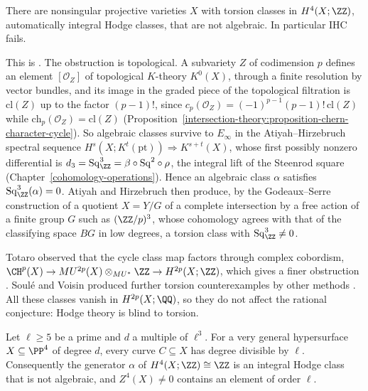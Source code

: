 \begin{theorem}\label{known-cases:theorem-atiyah-hirzebruch}
There are nonsingular projective varieties $X$ with torsion classes in $H^4(X; \ZZ)$, automatically integral Hodge classes, that are not algebraic. In particular $\mathrm{IHC}$ fails.
\end{theorem}

This is \cite{atiyah-hirzebruch-1962}. The obstruction is topological. A subvariety $Z$ of codimension $p$ defines an element $[\mathcal{O}_Z]$ of topological $K$-theory $K^0(X)$, through a finite
resolution by vector bundles, and its image in the graded piece of the topological filtration is $\mathrm{cl}(Z)$ up to the factor $(p-1)!$, since $c_p(\mathcal{O}_Z) = (-1)^{p-1}(p-1)!\,\mathrm{cl}(Z)$
while $\mathrm{ch}_p(\mathcal{O}_Z) = \mathrm{cl}(Z)$ (Proposition~\ref{intersection-theory:proposition-chern-character-cycle}). So algebraic classes survive to $E_\infty$ in the Atiyah--Hirzebruch spectral sequence
$H^s(X; K^t(\mathrm{pt})) \Rightarrow K^{s+t}(X)$, whose first possibly nonzero differential is $d_3 = \mathrm{Sq}^3_\ZZ = \beta\circ\mathrm{Sq}^2\circ\rho$, the integral lift of the Steenrod square
(Chapter~\ref{cohomology-operations}). Hence an algebraic class $\alpha$ satisfies $\mathrm{Sq}^3_\ZZ(\alpha) = 0$. Atiyah and Hirzebruch then produce, by the Godeaux--Serre construction of a quotient
$X = Y/G$ of a complete intersection by a free action of a finite group $G$ such as $(\ZZ/p)^3$, whose cohomology agrees with that of the classifying space $BG$ in low degrees, a torsion class with
$\mathrm{Sq}^3_\ZZ \neq 0$.

\begin{remark}\label{known-cases:remark-totaro}
Totaro observed that the cycle class map factors through complex cobordism, $\CH^p(X) \to MU^{2p}(X) \otimes_{MU^*}\ZZ \to H^{2p}(X; \ZZ)$, which gives a finer obstruction
\cite{totaro-1997}. Soul\'e and Voisin produced further torsion counterexamples by other methods \cite{soule-voisin-2005}. All these classes vanish in $H^{2p}(X; \QQ)$, so they do not affect the rational
conjecture: Hodge theory is blind to torsion.
\end{remark}

\begin{theorem}[Koll\'ar]\label{known-cases:theorem-kollar}
Let $\ell \geq 5$ be a prime and $d$ a multiple of $\ell^3$. For a very general hypersurface $X \subseteq \PP^4$ of degree $d$, every curve $C \subseteq X$ has degree divisible by $\ell$. Consequently the
generator $\alpha$ of $H^4(X; \ZZ) \cong \ZZ$ is an integral Hodge class that is not algebraic, and $Z^4(X) \neq 0$ contains an element of order $\ell$.
\end{theorem}

